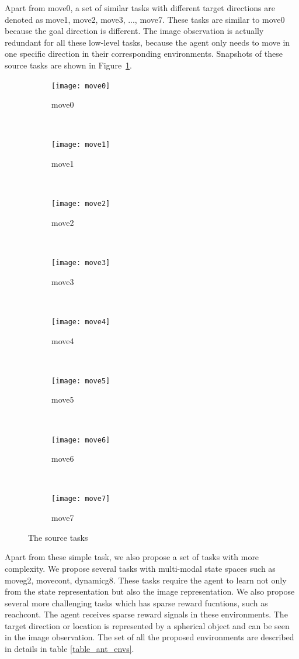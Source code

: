 Apart from move0, a set of similar tasks with different target directions are denoted as move1, move2, move3, ..., move7. These tasks are similar to move0 because the goal direction is different. The image observation is actually redundant for all these low-level tasks, because the agent only needs to move in one specific direction in their corresponding environments. Snapshots of these source tasks are shown in Figure~\ref{fig:task8}.
\begin{figure}[!htbp]
	\centering
	\begin{subfigure}[t]{0.3\textwidth}
		\centering
		\texttt{[image: move0]}
		\caption{move0}
	\end{subfigure}%
	~ 
	\begin{subfigure}[t]{0.3\textwidth}
		\centering
		\texttt{[image: move1]}
		\caption{move1}
	\end{subfigure}
	~ 
	\begin{subfigure}[t]{0.3\textwidth}
		\centering
		\texttt{[image: move2]}
		\caption{move2}
	\end{subfigure}
	~ 
	\begin{subfigure}[t]{0.3\textwidth}
		\centering
		\texttt{[image: move3]}
		\caption{move3}
	\end{subfigure}
	~ 
	\begin{subfigure}[t]{0.3\textwidth}
		\centering
		\texttt{[image: move4]}
		\caption{move4}
	\end{subfigure}
	~ 
	\begin{subfigure}[t]{0.3\textwidth}
		\centering
		\texttt{[image: move5]}
		\caption{move5}
	\end{subfigure}
	~ 
	\begin{subfigure}[t]{0.3\textwidth}
		\centering
		\texttt{[image: move6]}
		\caption{move6}
	\end{subfigure}
	~ 
	\begin{subfigure}[t]{0.3\textwidth}
		\centering
		\texttt{[image: move7]}
		\caption{move7}
	\end{subfigure}

	\caption{The source tasks}
	\label{fig:task8}
\end{figure}

Apart from these simple task, we also propose a set of tasks with more complexity. We propose several tasks with multi-modal state spaces such as moveg2, movecont, dynamicg8. These tasks require the agent to learn not only from the state representation but also the image representation. We also propose several more challenging tasks which has sparse reward fucntions, such as reachcont. The agent receives sparse reward signals in these environments. The target direction or location is represented by a spherical object and can be seen in the image observation.
The set of all the proposed environments are described in details in table \ref{table_ant_envs}.



